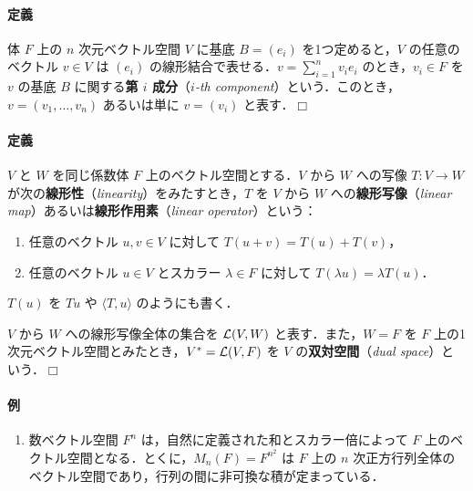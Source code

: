 \documentclass[pandoc,base=10pt,b5j,precisetext]{bxjsarticle}
\providecommand{\tightlist}{%
  \setlength{\itemsep}{0pt}\setlength{\parskip}{0pt}}
\let\oldparagraph\paragraph
\renewcommand{\paragraph}[1]{\oldparagraph{#1}\mbox{}}
\begin{document}
\hypertarget{components-of-vector-in-finite-dimensional-space}{%
\paragraph{定義}\label{components-of-vector-in-finite-dimensional-space}}

体 \(F\) 上の \(n\) 次元ベクトル空間 \(V\) に基底 \(B = (e_i)\)
を1つ定めると，\(V\) の任意のベクトル \(v \in V\) は \((e_i)\)
の線形結合で表せる．\(v = \sum_{i = 1}^n v_i e_i\) のとき，\(v_i \in F\)
を \(v\) の基底 \(B\) に関する\textbf{第 \(i\) 成分}（\emph{\(i\)-th
component}）という．このとき，\(v = (v_1, \dotsc, v_n)\) あるいは単に
\(v = (v_i)\) と表す．\(\Box\)

\hypertarget{linear-map}{%
\paragraph{定義}\label{linear-map}}

\(V\) と \(W\) を同じ係数体 \(F\) 上のベクトル空間とする．\(V\) から
\(W\) への写像 \(T \colon V \to W\)
が次の\textbf{線形性}（\emph{linearity}）をみたすとき，\(T\) を \(V\)
から \(W\) への\textbf{線形写像}（\emph{linear
map}）あるいは\textbf{線形作用素}（\emph{linear operator}）という：

\begin{enumerate}
\def\labelenumi{\arabic{enumi}.}
\tightlist
\item
  任意のベクトル \(u, v \in V\) に対して \(T(u + v) = T(u) + T(v)\)，
\item
  任意のベクトル \(u \in V\) とスカラー \(\lambda \in F\) に対して
  \(T(\lambda u) = \lambda T(u)\)．
\end{enumerate}

\(T(u)\) を \(Tu\) や \(\langle T, u \rangle\) のようにも書く．

\(V\) から \(W\) への線形写像全体の集合を \(\cal L(V, W)\)
と表す．また，\(W = F\) を \(F\)
上の1次元ベクトル空間とみたとき，\(V^* = \cal L(V, F)\) を \(V\)
の\textbf{双対空間}（\emph{dual space}）という．\(\Box\)

\hypertarget{ux4f8b}{%
\paragraph{例}\label{ux4f8b}}

\begin{enumerate}
\def\labelenumi{\roman{enumi})}
\tightlist
\item
  数ベクトル空間 \(F^n\) は，自然に定義された和とスカラー倍によって
  \(F\) 上のベクトル空間となる．とくに，\(M_n(F) = F^{n^2}\) は \(F\)
  上の \(n\)
  次正方行列全体のベクトル空間であり，行列の間に非可換な積が定まっている．
\end{enumerate}
\end{document}
